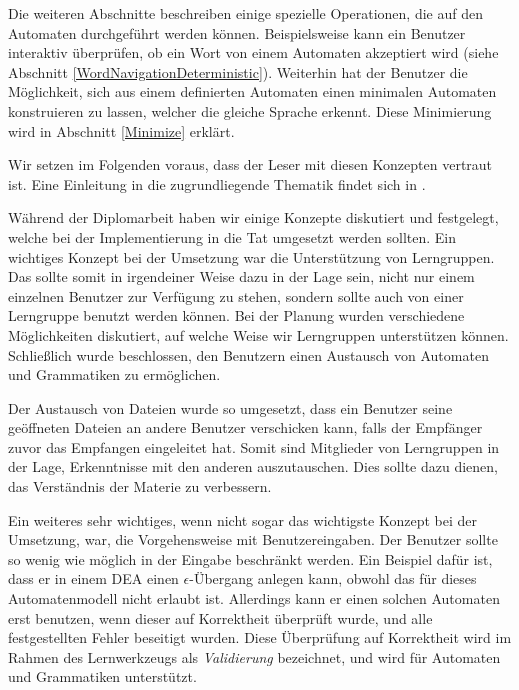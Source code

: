 Die weiteren Abschnitte beschreiben einige spezielle Operationen, die auf den
Automaten durchgeführt werden können. Beispielsweise kann ein Benutzer interaktiv
überprüfen, ob ein Wort von einem Automaten akzeptiert wird (siehe Abschnitt
\ref{WordNavigationDeterministic}). Weiterhin hat der Benutzer die Möglichkeit,
sich aus einem definierten Automaten einen minimalen Automaten konstruieren zu
lassen, welcher die gleiche Sprache erkennt. Diese Minimierung wird in Abschnitt
\ref{Minimize} erklärt.\vspace{10pt}

Wir setzen im Folgenden voraus, dass der Leser mit diesen Konzepten vertraut
ist. Eine Einleitung in die zugrundliegende Thematik findet sich in
\cite{Schoening}.\vspace{10pt}

Während der Diplomarbeit haben wir einige Konzepte diskutiert und festgelegt,
welche bei der Implementierung in die Tat umgesetzt werden sollten. Ein wichtiges Konzept
bei der Umsetzung war die Unterstützung von Lerngruppen. Das \gtitool sollte
somit in irgendeiner Weise dazu in der Lage sein, nicht nur einem einzelnen
Benutzer zur Verfügung zu stehen, sondern sollte auch von einer Lerngruppe
benutzt werden können. Bei der Planung wurden verschiedene Möglichkeiten
diskutiert, auf welche Weise wir Lerngruppen unterstützen können. Schließlich
wurde beschlossen, den Benutzern einen Austausch von Automaten und Grammatiken zu
ermöglichen.\vspace{10pt}

Der Austausch von Dateien wurde so umgesetzt, dass ein Benutzer seine geöffneten
Dateien an andere Benutzer verschicken kann, falls der Empfänger zuvor das
Empfangen eingeleitet hat. Somit sind Mitglieder von Lerngruppen in der Lage,
Erkenntnisse mit den anderen auszutauschen. Dies sollte dazu dienen, das
Verständnis der Materie zu verbessern.\vspace{10pt}

Ein weiteres sehr wichtiges, wenn nicht sogar das wichtigste Konzept bei der
Umsetzung, war, die Vorgehensweise mit Benutzereingaben. Der Benutzer sollte so
wenig wie möglich in der Eingabe beschränkt werden. Ein Beispiel dafür ist, dass
er in einem DEA einen $\epsilon$-Übergang anlegen kann, obwohl das für dieses
Automatenmodell nicht erlaubt ist. Allerdings kann er einen solchen Automaten
erst benutzen, wenn dieser auf Korrektheit überprüft wurde, und alle
festgestellten Fehler beseitigt wurden. Diese Überprüfung auf Korrektheit wird im
Rahmen des Lernwerkzeugs als {\em Validierung} bezeichnet, und wird für Automaten
und Grammatiken unterstützt.\vspace{10pt}

